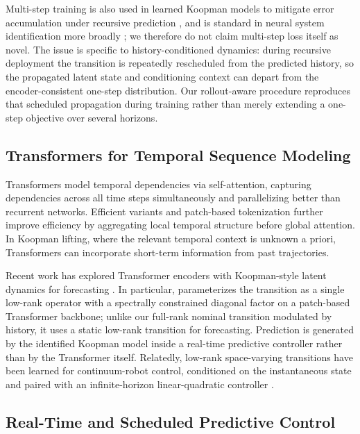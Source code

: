 Multi-step training is also used in learned Koopman models to mitigate error accumulation under recursive prediction \cite{lusch2018deep, otto2019linearly, azencot2020forecasting, wu2026multistep}, and is standard in neural system identification more broadly \cite{forgione2021dynonet}; we therefore do not claim multi-step loss itself as novel. The issue is specific to history-conditioned dynamics: during recursive deployment the transition is repeatedly rescheduled from the predicted history, so the propagated latent state and conditioning context can depart from the encoder-consistent one-step distribution. Our rollout-aware procedure reproduces that scheduled propagation during training rather than merely extending a one-step objective over several horizons.

\subsection{Transformers for Temporal Sequence Modeling}

Transformers \cite{vaswani2017attention} model temporal dependencies via self-attention, capturing dependencies across all time steps simultaneously and parallelizing better than recurrent networks. Efficient variants and patch-based tokenization \cite{zhou2021informer, wang2020linformer, choromanski2021performer, wu2021autoformer, zhou2022fedformer, nie2023time} further improve efficiency by aggregating local temporal structure before global attention. In Koopman lifting, where the relevant temporal context is unknown a priori, Transformers can incorporate short-term information from past trajectories.

Recent work has explored Transformer encoders with Koopman-style latent dynamics for forecasting \cite{forootani2026deepkoopformer, forootani2026spectral}. In particular, \cite{forootani2026spectral} parameterizes the transition as a single low-rank operator with a spectrally constrained diagonal factor on a patch-based Transformer backbone; unlike our full-rank nominal transition modulated by history, it uses a static low-rank transition for forecasting. Prediction is generated by the identified Koopman model inside a real-time predictive controller rather than by the Transformer itself. Relatedly, low-rank space-varying transitions have been learned for continuum-robot control, conditioned on the instantaneous state and paired with an infinite-horizon linear-quadratic controller \cite{feizi2025deepkoopman}.

\subsection{Real-Time and Scheduled Predictive Control}

